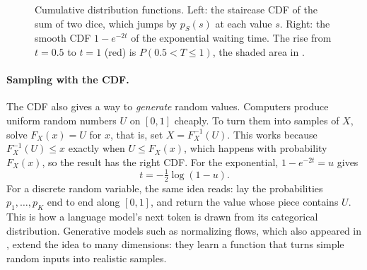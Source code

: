 \begin{figure}[ht]
  \centering
  \caption{Cumulative distribution functions. Left: the staircase CDF of
    the sum of two dice, which jumps by $p_S(s)$ at each value $s$.
    Right: the smooth CDF $1 - e^{-2t}$ of the exponential waiting time.
    The rise from $t = 0.5$ to $t = 1$ (red) is $P(0.5 < T \le 1)$, the
    shaded area in .}
  \label{fig:ch05-cdf}
\end{figure}

\paragraph{Sampling with the CDF.}
The CDF also gives a way to \emph{generate} random values. Computers
produce uniform random numbers $U$ on $[0, 1]$ cheaply. To turn them
into samples of $X$, solve $F_X(x) = U$ for $x$, that is, set $X =
F_X^{-1}(U)$. This works because $F_X^{-1}(U) \le x$ exactly when $U \le
F_X(x)$, which happens with probability $F_X(x)$, so the result has the
right CDF. For the exponential, $1 - e^{-2t} = u$ gives
\[
  t = -\tfrac12 \log(1 - u) .
\]
For a discrete random variable, the same idea reads: lay the
probabilities $p_1, \dots, p_K$ end to end along $[0, 1]$, and return
the value whose piece contains $U$. This is how a language model's next
token is drawn from its categorical distribution. Generative models
such as normalizing flows, which also appeared in
, extend the idea to many dimensions: they learn
a function that turns simple random inputs into realistic samples.


